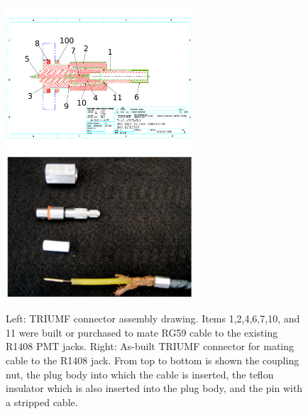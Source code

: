 \documentclass[review,number,sort&compress]{elsarticle}
\begin{document}
\begin{figure}[ht]
\begin{center}
\includegraphics[width=2.75in,page=13]{graphics/snoConnectorDrawings.pdf}
\includegraphics[width=2.75in]{graphics/connectorpic.pdf}
\caption{Left: TRIUMF connector assembly drawing. Items 1,2,4,6,7,10, and 11 were built or purchased to mate RG59 cable to the existing R1408 PMT jacks. Right: As-built TRIUMF connector for mating cable to the R1408 jack. From top to bottom is shown the coupling nut, the plug body into which the cable is inserted, the teflon insulator which is also inserted into the plug body, and the pin with a stripped cable.
\label{fig:connectordrawing}}
\end{center}
\end{figure}
\end{document}
